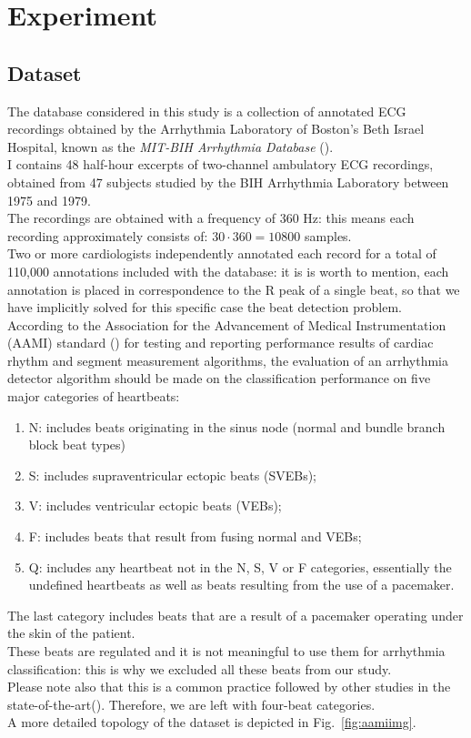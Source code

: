 \documentclass[LaM,binding=0.6cm]{sapthesis}
\begin{document}
\chapter{Experiment}

\section{Dataset}
The database considered in this study is a collection of annotated ECG recordings obtained by the Arrhythmia Laboratory of Boston's Beth Israel Hospital, known as the \textit{MIT-BIH Arrhythmia Database} (\cite{dbmitbih}).\\I contains 48 half-hour excerpts of two-channel ambulatory ECG recordings, obtained from 47 subjects studied by the BIH Arrhythmia Laboratory between 1975 and 1979.\\The recordings are obtained with a frequency of 360 Hz: this means each recording approximately consists of: $30\cdot360=10800$ samples.\\Two or more cardiologists independently annotated each record for a total of 110,000 annotations included with the database: it is is worth to mention, each annotation is placed in correspondence to the R peak of a single beat, so that we have implicitly solved for this specific case the beat detection problem.\\According to the Association for the Advancement of Medical Instrumentation (AAMI) standard (\cite{aamistd}) for testing and reporting performance results of cardiac rhythm and segment measurement algorithms, the evaluation of an arrhythmia detector algorithm should be made on the classification performance on five major categories of heartbeats:
\begin{enumerate}
\item N: includes beats originating in the sinus node (normal and bundle branch block beat types)
\item S: includes supraventricular ectopic beats (SVEBs);
\item V: includes ventricular ectopic beats (VEBs);
\item F: includes beats that result from fusing normal and VEBs;
\item Q: includes any heartbeat not in the N, S, V or F categories, essentially the undefined heartbeats as well as beats resulting from the use of a pacemaker.
\end{enumerate}
The last category includes beats that are a result of a pacemaker operating under the skin of the patient.\\These beats are regulated and it is not meaningful to use them for arrhythmia classification: this is why we excluded all these beats from our study.\\Please note also that this is a common practice followed by other studies in the state-of-the-art(\cite{fog}). Therefore, we are left with four-beat categories.\\A more detailed topology of the dataset is depicted in Fig.~\ref{fig:aamiimg}.
\end{document}
